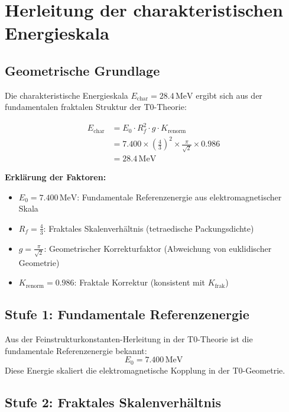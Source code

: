 	\section{Herleitung der charakteristischen Energieskala}
	
	\subsection{Geometrische Grundlage}
	
	Die charakteristische Energieskala $E_{\text{char}} = 28.4\,\text{MeV}$ ergibt sich aus der fundamentalen fraktalen Struktur der T0-Theorie:
	
	\begin{align}
		E_{\text{char}} &= E_0 \cdot R_f^2 \cdot g \cdot K_{\text{renorm}} \\
		&= 7.400 \times \left(\frac{4}{3}\right)^2 \times \frac{\pi}{\sqrt{2}} \times 0.986 \\
		&= 28.4\,\text{MeV}
	\end{align}
	
	\textbf{Erklärung der Faktoren:}
	\begin{itemize}
		\item $E_0 = 7.400\,\text{MeV}$: Fundamentale Referenzenergie aus elektromagnetischer Skala
		\item $R_f = \frac{4}{3}$: Fraktales Skalenverhältnis (tetraedische Packungsdichte)  
		\item $g = \frac{\pi}{\sqrt{2}}$: Geometrischer Korrekturfaktor (Abweichung von euklidischer Geometrie)
		\item $K_{\text{renorm}} = 0.986$: Fraktale Korrektur (konsistent mit $K_{\text{frak}}$)
	\end{itemize}
	
	\subsection{Stufe 1: Fundamentale Referenzenergie}
	
	Aus der Feinstrukturkonstanten-Herleitung in der T0-Theorie ist die fundamentale Referenzenergie bekannt:
	\begin{equation}
		E_0 = 7.400\,\text{MeV}
	\end{equation}
	Diese Energie skaliert die elektromagnetische Kopplung in der T0-Geometrie.
	
	\subsection{Stufe 2: Fraktales Skalenverhältnis}
	
